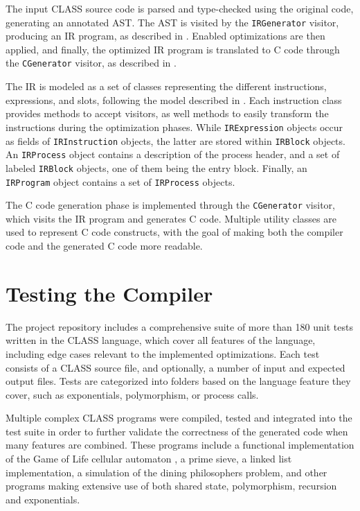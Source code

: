 The input \ac{CLASS} source code is parsed and type-checked using the original code, generating an annotated \ac{AST}. The \ac{AST} is visited by the \texttt{IRGenerator} visitor, producing an \ac{IR} program, as described in . Enabled optimizations are then applied, and finally, the optimized \ac{IR} program is translated to C code through the \texttt{CGenerator} visitor, as described in .

The \ac{IR} is modeled as a set of classes representing the different instructions, expressions, and slots, following the model described in . Each instruction class provides methods to accept visitors, as well methods to easily transform the instructions during the optimization phases. While \texttt{IRExpression} objects occur as fields of \texttt{IRInstruction} objects, the latter are stored within \texttt{IRBlock} objects. An \texttt{IRProcess} object contains a description of the process header, and a set of labeled \texttt{IRBlock} objects, one of them being the entry block. Finally, an \texttt{IRProgram} object contains a set of \texttt{IRProcess} objects.

The C code generation phase is implemented through the \texttt{CGenerator} visitor, which visits the \ac{IR} program and generates C code. Multiple utility classes are used to represent C code constructs, with the goal of making both the compiler code and the generated C code more readable.

\section{Testing the Compiler}

The project repository includes a comprehensive suite of more than 180 unit tests written in the \ac{CLASS} language, which cover all features of the language, including edge cases relevant to the implemented optimizations. Each test consists of a \ac{CLASS} source file, and optionally, a number of input and expected output files. Tests are categorized into folders based on the language feature they cover, such as exponentials, polymorphism, or process calls.

Multiple complex \ac{CLASS} programs were compiled, tested and integrated into the test suite in order to further validate the correctness of the generated code when many features are combined. These programs include a functional implementation of the Game of Life cellular automaton \cite{GameOfLife:1970}, a prime sieve, a linked list implementation, a simulation of the dining philosophers problem, and other programs making extensive use of both shared state, polymorphism, recursion and exponentials.

